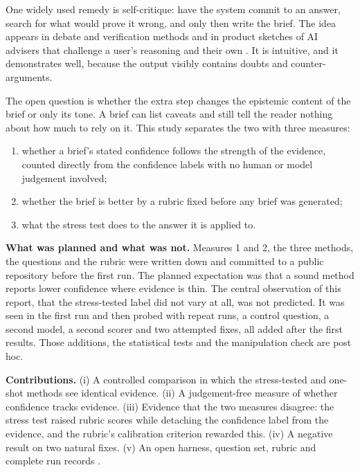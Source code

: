 \documentclass[11pt]{article}
\begin{document}
One widely used remedy is self-critique: have the system commit to an answer, search for what would prove it wrong, and only then write the brief. The idea appears in debate and verification methods \cite{du2023debate,dhuliawala2023cove} and in product sketches of AI advisers that challenge a user's reasoning and their own \cite{forethought_angels}. It is intuitive, and it demonstrates well, because the output visibly contains doubts and counter-arguments.

The open question is whether the extra step changes the epistemic content of the brief or only its tone. A brief can list caveats and still tell the reader nothing about how much to rely on it. This study separates the two with three measures:

\begin{enumerate}
\item whether a brief's stated confidence follows the strength of the evidence, counted directly from the confidence labels with no human or model judgement involved;
\item whether the brief is better by a rubric fixed before any brief was generated;
\item what the stress test does to the answer it is applied to.
\end{enumerate}

\textbf{What was planned and what was not.} Measures 1 and 2, the three methods, the questions and the rubric were written down and committed to a public repository before the first run. The planned expectation was that a sound method reports lower confidence where evidence is thin. The central observation of this report, that the stress-tested label did not vary at all, was not predicted. It was seen in the first run and then probed with repeat runs, a control question, a second model, a second scorer and two attempted fixes, all added after the first results. Those additions, the statistical tests and the manipulation check are post hoc.

\textbf{Contributions.} (i) A controlled comparison in which the stress-tested and one-shot methods see identical evidence. (ii) A judgement-free measure of whether confidence tracks evidence. (iii) Evidence that the two measures disagree: the stress test raised rubric scores while detaching the confidence label from the evidence, and the rubric's calibration criterion rewarded this. (iv) A negative result on two natural fixes. (v) An open harness, question set, rubric and complete run records \cite{vet}.
\end{document}
